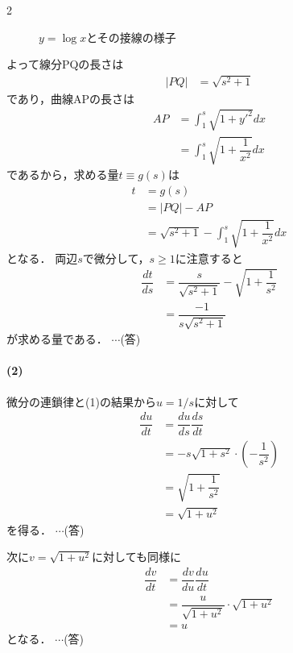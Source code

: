 \documentclass[../../main.tex]{subfiles}
\begin{document}
\begin{multicols}{2}
\begin{figure}[H]
    \caption{$y=\log x$とその接線の様子}
    \label{1990-3:fig:1}
  \end{figure}

  よって線分PQの長さは
  \begin{align}
    |PQ|
    & = \sqrt{s^2+1} \label{eq:1}
  \end{align}
  であり，曲線APの長さは
  \begin{align}
    AP
    & = \int_1^s \sqrt{1+y'^2} dx                             \\
    & =\int_1^s \sqrt{1+\dfrac{1}{x^2}} dx \label{eq:2}
  \end{align}
  であるから，求める量$t\equiv g(s)$は
  \begin{align}
    t
    & = g(s) \\
    & = |PQ| - AP \\
    & = \sqrt{s^2+1} - \int_1^s \sqrt{1+\dfrac{1}{x^2}} dx \label{eq:3}
  \end{align}
  となる．
  両辺$s$で微分して，$s\ge 1$に注意すると
  \begin{align}
    \dfrac{dt}{ds}
    & = \dfrac{s}{\sqrt{s^2+1}} - \sqrt{1+\dfrac{1}{s^2}} \\
    & =  \dfrac{-1}{s\sqrt{s^2+1}}
  \end{align}
  が求める量である．  $\cdots$(答)
  \paragraph{(2)}
  微分の連鎖律と(1)の結果から$u=1/s$に対して
  \begin{align}
    \dfrac{du}{dt}
    & = \dfrac{du}{ds} \dfrac{ds}{dt}                      \\
    & = -s\sqrt{1+s^2} \cdot \left(-\dfrac{1}{s^2}\right) \\
    & = \sqrt{1+\dfrac{1}{s^2}} \\
    & = \sqrt{1+u^2} \label{eq:4}
  \end{align}
  を得る． $\cdots$(答)

  次に$v=\sqrt{1+u^2}$に対しても同様に
  \begin{align}
    \dfrac{dv}{dt}
    & = \dfrac{dv}{du} \dfrac{du}{dt}               \\
    & = \dfrac{u}{\sqrt{1+u^2}} \cdot \sqrt{1+u^2} \\
    & = u
  \end{align}
  となる． $\cdots$(答)


\end{multicols}
\end{document}
